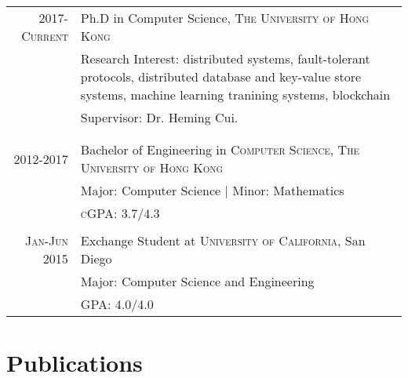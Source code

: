 \documentclass[a4paper,8pt]{article} %
\begin{document}
\begin{tabular}{rl}	



\textsc{2017-Current} & Ph.D in Computer Science, \textsc{The University of Hong Kong}\\
& Research Interest: distributed systems, fault-tolerant protocols, distributed database and key-value store systems, machine learning tranining systems, blockchain\\
& Supervisor: Dr. Heming Cui.\\
\\&\\

\textsc{2012-2017} & Bachelor of Engineering in \textsc{Computer Science}, \textsc{The University of Hong Kong}\\
& Major: Computer Science | Minor: Mathematics\\
&\normalsize \textsc{cGPA}: 3.7/4.3 
\\&\\

\textsc{Jan-Jun} 2015& Exchange Student at \textsc{}\textsc{University of California}, San Diego  \\
& Major: Computer Science and Engineering \\
&\normalsize \textsc{GPA}: 4.0/4.0 \\


\end{tabular}



\section{Publications}
\end{document}
